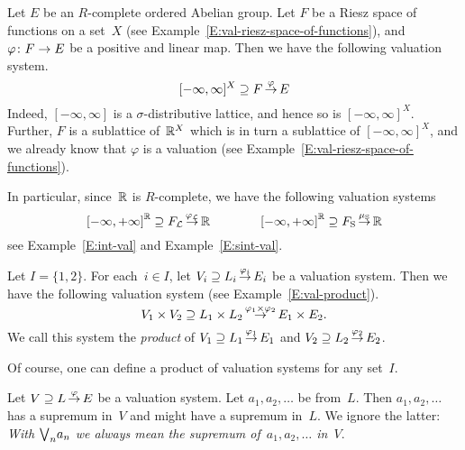 \documentclass[main.tex]{subfiles}
\begin{document}
%
%
\begin{ex}
\label{E:riesz-function-space-simple-system}
Let $E$ be an $R$-complete ordered Abelian group.
Let $F$ be a Riesz space of functions on a set~$X$
(see Example~\ref{E:val-riesz-space-of-functions}),
and $\varphi\colon F\rightarrow E$ be a positive and linear map.
Then we have the following  valuation system.
\begin{equation*}
[-\infty,\infty]^X \supseteq F\,\smash{\stackrel{\varphi}{\rightarrow}}\,E
\end{equation*}
Indeed, $[-\infty,\infty]$ is a $\sigma$-distributive
lattice,
and hence so is $[-\infty,\infty]^X$.
Further, $F$ is a sublattice of~$\mathbb{R}^X$
which is in turn a sublattice of $[-\infty,\infty]^X$,
and we already know that
$\varphi$ is a valuation (see Example~\ref{E:val-riesz-space-of-functions}).

In particular, since~$\mathbb{R}$ is $R$-complete,
we have the following valuation systems
\begin{equation*}
{[-\infty,+\infty]}^{\mathbb{R}} \supseteq F_{\mathcal{L}}\,\smash{\stackrel{\varphi_{\mathcal{L}}}{\rightarrow}}\,\mathbb{R}
\qquad\qquad
{[-\infty,+\infty]}^{\mathbb{R}} \supseteq F_{\mathrm{S}}\,\smash{\stackrel{\mu_{\mathrm{S}}}{\rightarrow}}\,\mathbb{R}
\end{equation*}
see Example~\ref{E:int-val} and Example~\ref{E:sint-val}.
\end{ex}

\begin{ex}
Let $I=\{1,2\}$.
For each~$i\in I$,
let $V_i \supseteq L_i\,\smash{\stackrel{\varphi_i}{\rightarrow}}\,E_i$
be a  valuation system.
Then we have the following  valuation system
(see Example~\ref{E:val-product}).
\begin{equation*}
V_1\times V_2 \supseteq L_1 \times L_2\,\smash{\stackrel{\varphi_1 \times \varphi_2}{\rightarrow}}\,E_1 \times E_2.
\end{equation*}
We call this system
the \emph{product} of $V_1 \supseteq L_1\,\smash{\stackrel{\varphi_1}{\rightarrow}}\,E_1$
and $V_2 \supseteq L_2\,\smash{\stackrel{\varphi_2}{\rightarrow}}\,E_2$.

Of course,
one can define a product of  valuation systems
for any set~$I$.
\end{ex}

%
%
\begin{nt}
Let $V \supseteq L\,\smash{\stackrel{\varphi}{\rightarrow}}\,E$ be a  valuation system.
Let $a_1, a_2, \dotsc$ be from~$L$.
Then $a_1, a_2,\dotsc$ has a supremum
in~$V$ and might have a supremum in~$L$.
We ignore the latter:
\emph{With $\textstyle{\bigvee}_n a_n$
we always mean the supremum of~$a_1, a_2,\dotsc $ in~$V$}.
\end{nt}
%
%
%
\end{document}
